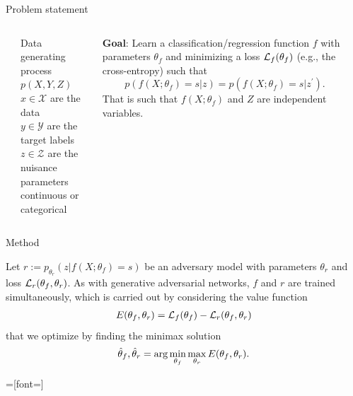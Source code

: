 \documentclass[final,unknownkeysallowed]{beamer}
\begin{document}
\begin{frame}{}
\begin{textblock}{0.32}
\begin{block}{Problem statement \phantom{p}}
\begin{columns}[t]
\begin{column}{0.02\textwidth}
\end{column}
\begin{column}{0.48\textwidth}
Data generating process $p(X, Y, Z)$ \\
$x \in \mathcal{X}$ are the data \\
$y \in \mathcal{Y}$ are the target labels \\
$z \in \mathcal{Z}$ are the nuisance parameters \\
\hspace{1.2cm} continuous or categorical
\end{column}
\begin{column}{0.48\textwidth}
\textbf{\color{red} Goal}: Learn a classification/regression function $f$
with parameters $\theta_{f}$ and minimizing a loss ${\cal L}_f(\theta_f)$ (e.g., the cross-entropy) such that
$$p(f(X ; \theta_f) = s | z ) = p(f(X ; \theta_f) = s | z^\prime ).$$
That is {\color{blue} such that $f(X ; \theta_f)$ and $Z$ are independent variables}.
\end{column}
\begin{column}{0.02\textwidth}
\end{column}
\end{columns}

\end{block}

\vspace{0.5cm}
\begin{block}{Method \phantom{p}}

Let $r := p_{\theta_r}(z | f(X;\theta_f)=s)$ be {\color{red} an adversary model} with
parameters $\theta_r$ and loss ${\cal L}_r(\theta_f, \theta_r)$. As with
generative adversarial networks, $f$ and $r$ are trained simultaneously, which
is carried out by considering the value function
\begin{align}
E(\theta_f, \theta_r) = {\cal L}_f(\theta_f) - {\cal L}_r(\theta_f, \theta_r)
\end{align}
that we optimize by finding the minimax solution
\begin{align}
\smash{\hat\theta_f, \hat\theta_r} = \arg \min_{\theta_f} \max_{\theta_r} E(\theta_f, \theta_r).
\end{align}

\begin{center}
=[font=\fontsize{25}{11.2}]
\begin{figure}


\end{figure}
\end{center}
\end{block}
\end{textblock}
\end{frame}
\end{document}
